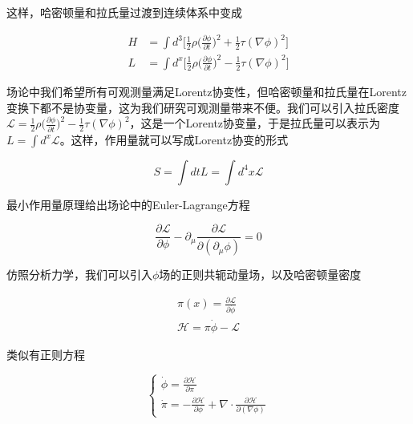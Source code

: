 这样，哈密顿量和拉氏量过渡到连续体系中变成

\begin{equation}
    \begin{split}
        H &= \int d^3\bigl[\frac{1}{2}\rho\bigl(\frac{\partial\phi}{\partial t}\bigr)^2+\frac{1}{2}\tau(\nabla\phi)^2\bigr] \\
        L &= \int d^x\bigl[\frac{1}{2}\rho\bigl(\frac{\partial\phi}{\partial t}\bigr)^2-\frac{1}{2}\tau(\nabla\phi)^2\bigr]
    \end{split}
\end{equation}

场论中我们希望所有可观测量满足Lorentz协变性，但哈密顿量和拉氏量在Lorentz变换下都不是协变量，这为我们研究可观测量带来不便。我们可以引入拉氏密度$\mathcal{L}=\frac{1}{2}\rho\bigl(\frac{\partial\phi}{\partial t}\bigr)^2-\frac{1}{2}\tau(\nabla\phi)^2$，这是一个Lorentz协变量，于是拉氏量可以表示为$L=\int d^x \mathcal{L}$。这样，作用量就可以写成Lorentz协变的形式

\begin{equation}
    S=\int dtL=\int d^4x\mathcal{L}
\end{equation}

最小作用量原理给出场论中的Euler-Lagrange方程

\begin{equation}
    \frac{\partial\mathcal{L}}{\partial\phi}-\partial_\mu\frac{\partial\mathcal{L}}{\partial(\partial_\mu\phi)}=0
\end{equation}

仿照分析力学，我们可以引入$\phi$场的正则共轭动量场，以及哈密顿量密度

\begin{equation}
    \begin{split}
        \pi(x)=\frac{\partial\mathcal{L}}{\partial\dot{\phi}} \\
        \mathcal{H}=\pi\dot{\phi}-\mathcal{L}
    \end{split}
\end{equation}

类似有正则方程

\begin{equation}
    \left\{
        \begin{array}{lr}
            \dot{\phi}=\frac{\partial\mathcal{H}}{\partial\pi} \\
            \dot{\pi}=-\frac{\partial\mathcal{H}}{\partial\phi}+\nabla\cdot\frac{\partial\mathcal{H}}{\partial(\nabla\phi)}
        \end{array}
    \right.
\end{equation}



